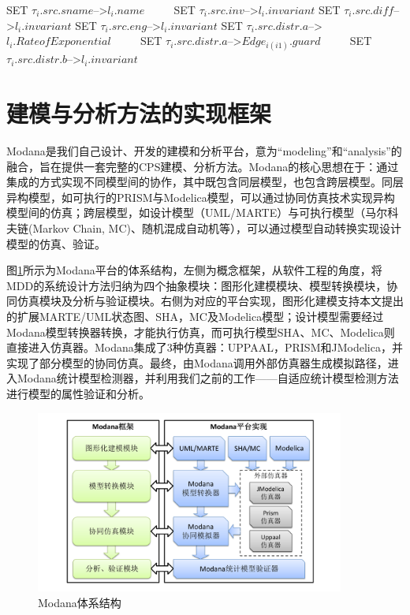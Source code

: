 \begin{algorithmic}[1]
		\STATE SET $\tau_{i}.src.sname$-->$l_{i}.name$ ~~~~
		\STATE SET $\tau_{i}.src.inv$-->$l_{i}.invariant$
		\STATE SET $\tau_{i}.src.diff$-->$l_{i}.invariant$
		\STATE SET $\tau_{i}.src.eng$-->$l_{i}.invariant$
			\STATE SET $\tau_{i}.src.distr.a$-->$l_{i}.Rate of Exponential$ ~~~~
			\STATE SET $\tau_{i}.src.distr.a$-->$Edge_{i(i1)}.guard$ ~~~~
			\STATE SET $\tau_{i}.src.distr.b$-->$l_{i}.invariant$
		\ENDIF

		\ENDFOR
	\end{algorithmic}

\section{建模与分析方法的实现框架}
	Modana\citep{DBLP:conf/compsac/ChengWLD15,杜德慧2017一种面向}是我们自己设计、开发的建模和分析平台，意为“modeling”和“analysis”的融合，旨在提供一套完整的CPS建模、分析方法。Modana的核心思想在于：通过集成的方式实现不同模型间的协作，其中既包含同层模型，也包含跨层模型。同层异构模型，如可执行的PRISM\citep{Kwiatkowska2002PRISM}与Modelica\citep{Elmqvist1997Modelica}模型，可以通过协同仿真技术\citep{Blochwitz2012Functional}实现异构模型间的仿真；跨层模型，如设计模型（UML/MARTE）与可执行模型（马尔科夫链(Markov Chain, MC)\citep{施仁杰1992马尔科夫链基础及其应用}、随机混成自动机等），可以通过模型自动转换实现设计模型的仿真、验证。
	
	图\ref{modana}所示为Modana平台的体系结构，左侧为概念框架，从软件工程的角度，将MDD的系统设计方法归纳为四个抽象模块：图形化建模模块、模型转换模块，协同仿真模块及分析与验证模块。右侧为对应的平台实现，图形化建模支持本文提出的扩展MARTE/UML状态图、SHA，MC及Modelica模型；设计模型需要经过Modana模型转换器转换，才能执行仿真，而可执行模型SHA、MC、Modelica则直接进入仿真器。Modana集成了3种仿真器：UPPAAL，PRISM和JModelica，并实现了部分模型的协同仿真。最终，由Modana调用外部仿真器生成模拟路径，进入Modana统计模型检测器，并利用我们之前的工作——自适应统计模型检测方法\citep{杜德慧2017一种面向}进行模型的属性验证和分析。
	\begin{figure}[!t]
	\centering
	\includegraphics[width=4in]{modana.pdf}
	\caption{Modana体系结构}
	\label{modana}
	\end{figure}
	

